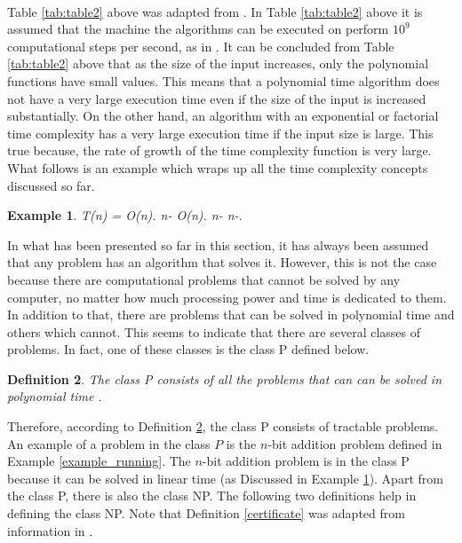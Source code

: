 \documentclass[12pt]{article}
\newtheorem{definition}{Definition}[subsection]
\newtheorem{example}[definition]{Example}
\numberwithin{equation}{subsection}
\numberwithin{table}{subsection}
\numberwithin{algorithm}{subsection}
\begin{document}
\\Table \ref{tab:table2} above was adapted from \cite{pettis}. In Table \ref{tab:table2} above it is assumed that the machine the algorithms can be executed on perform $\mathit{10^9}$ computational steps per second, as in \cite{pettis}. It can be concluded from Table \ref{tab:table2} above that as the size of the input increases, only the polynomial functions have small values. This means that a polynomial time algorithm does not have a very large execution time even if the size of the input is increased substantially. On the other hand, an algorithm with an exponential or factorial time complexity has a very large execution time if the input size is large. This true because, the rate of growth of the time complexity function is very large. What follows is an example which wraps up all the time complexity concepts discussed so far.
\begin{example}
\label{time_complexity_example}
{} T(n) = O(n). {} n-{} O(n). {} n-{} n-{}.
\end{example}
In what has been presented so far in this section, it has always been assumed that any problem has an algorithm that solves it. However, this is not the case because there are computational problems that cannot be solved by any computer, no matter how much processing power and time is dedicated to them. In addition to that, there are problems that can be solved in polynomial time and others which cannot. This seems to indicate that there are several classes of problems. In fact, one of these classes is the class P defined below. \cite{cormen_leiserson_rivest_stein}
\begin{definition}
\label{P}
The class P consists of all the problems that can can be solved in polynomial time {}.
\end{definition}
Therefore, according to Definition \ref{P}, the class P consists of tractable problems. An example of a problem in the class $\mathit{P}$ is the $\mathit{n}$-bit addition problem defined in Example \ref{example_running}. The $\mathit{n}$-bit addition problem is in the class P because it can be solved in linear time (as Discussed in Example \ref{time_complexity_example}). Apart from the class P, there is also the class NP. The following two definitions help in defining the class NP. Note that Definition \ref{certificate} was adapted from information in \cite{kaveh_tehada_2013}.
\end{document}
